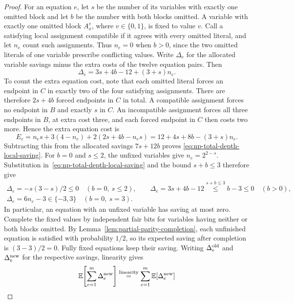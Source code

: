 \begin{proof}
For an equation $e$, let $s$ be the number of its variables with
exactly one omitted block and let $b$ be the number with both blocks
omitted. A variable with exactly one omitted block $A_x^v$, where
$v\in\{0,1\}$, is fixed to value $v$. Call a satisfying local assignment
compatible if it agrees with every omitted literal, and let $n_e$ count such assignments.
Thus $n_e=0$ when $b>0$, since the two omitted literals of one
variable prescribe conflicting values.
Write $\Delta_e$ for the allocated variable savings minus the extra
costs of the twelve equation pairs. Then
\begin{equation}\label{eq:np-total-depth-local-saving}
 \Delta_e=3s+4b-12+(3+s)n_e.
\end{equation}
To count the extra equation cost, note that each omitted literal
forces an endpoint in $C$ in exactly two of the four satisfying assignments.
There are therefore $2s+4b$ forced endpoints in $C$ in total.
A compatible assignment forces no endpoint in $B$ and exactly $s$
in $C$. An incompatible assignment forces all three endpoints in
$B$, at extra cost three, and each forced endpoint in $C$ then
costs two more. Hence the extra equation cost is
\[
 E_e=n_es+3(4-n_e)+2(2s+4b-n_es)
 =12+4s+8b-(3+s)n_e.
\]
Subtracting this from the allocated savings $7s+12b$ proves
\eqref{eq:np-total-depth-local-saving}.
For $b=0$ and $s\leq2$, the unfixed variables give
$n_e=2^{2-s}$. Substitution in~\eqref{eq:np-total-depth-local-saving}
and the bound $s+b\leq3$ therefore give
\begin{equation}\label{eq:np-total-depth-saving-table}
\begin{gathered}
 \Delta_e=-s(3-s)/2\leq0 \quad (b=0,\ s\leq2),\qquad \Delta_e=3s+4b-12
  \overset{s+b\leq3}{\leq}b-3\leq0 \quad (b>0),\\
 \Delta_e=6n_e-3\in\{-3,3\} \quad (b=0,\ s=3).
\end{gathered}
\end{equation}
In particular, an equation with an unfixed variable has saving at most
zero. Complete the fixed values by independent fair bits for variables
having neither or both blocks omitted. By
Lemma~\ref{lem:partial-parity-completion}, each unfinished equation
is satisfied with probability $1/2$, so its expected saving after
completion is $(3-3)/2=0$. Fully fixed equations keep their saving.
Writing $\Delta_e^{\rm old}$ and
$\Delta_e^{\rm new}$ for the respective savings, linearity gives
\[
 \mathbb E\!\left[\sum_{e=1}^m\Delta_e^{\rm new}\right]
 \overset{\text{linearity}}{=}
 \sum_{e=1}^m\mathbb E[\Delta_e^{\rm new}]
\]
\end{proof}

